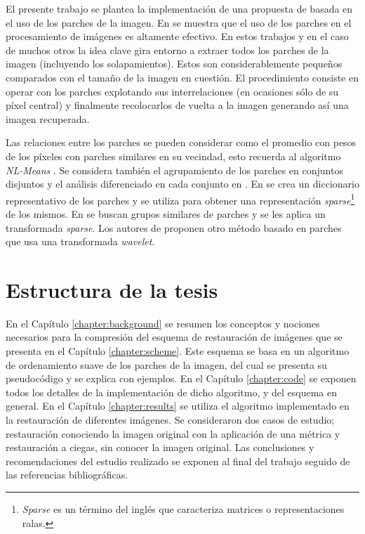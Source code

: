 El presente trabajo se plantea la implementaci\'on de una propuesta de \II basada en el uso de los parches de la imagen. En \cite{buades2005review,chatterjee2009clustering,yu2010image,yu2011solving,dong2011image,dong2011sparsity,zoran2011learning,elad2006image,mairal2007sparse,mairal2009non,zeyde2010single,dabov2007image,li2008patch} se muestra que el uso de los parches en el procesamiento de im\'agenes es altamente efectivo. En estos trabajos y en el caso de muchos otros la idea clave gira entorno a extraer todos los parches de la imagen (incluyendo los solapamientos). Estos son considerablemente pequeños comparados con el tamaño de la imagen en cuesti\'on. El procedimiento consiste en operar con los parches explotando sus interrelaciones (en ocasiones s\'olo de su p\'ixel central) y finalmente recolocarlos de vuelta a la imagen generando as\'i una imagen recuperada.

Las relaciones entre los parches se pueden considerar como el promedio con pesos de los p\'ixeles con parches similares en su vecindad, esto recuerda al algoritmo \textit{NL-Means} \cite{buades2005review}. Se considera tambi\'en el agrupamiento de los parches en conjuntos disjuntos y el análisis diferenciado en cada conjunto en \cite{chatterjee2009clustering,yu2010image,yu2011solving,dong2011image,dong2011sparsity,zoran2011learning}. En \cite{elad2006image,mairal2007sparse,mairal2009non,zeyde2010single} se crea un diccionario representativo de los parches y se utiliza para obtener una representaci\'on \textit{sparse}\footnote{\textit{Sparse} es un término del inglés que caracteriza matrices o representaciones ralas.} de los mismos. En \cite{mairal2009non,dabov2007image,li2008patch} se buscan grupos similares de parches y se les aplica un transformada \textit{sparse}. Los autores de \cite{ram2011generalized,ram2012redundant} proponen otro m\'etodo basado en parches que usa una transformada \textit{wavelet}.

\section*{Estructura de la tesis}

En el Cap\'itulo \ref{chapter:background} se resumen los conceptos y nociones necesarios para la compresi\'on del esquema de restauraci\'on de im\'agenes que se presenta en el Cap\'itulo \ref{chapter:scheme}. Este esquema se basa en un algoritmo de ordenamiento suave de los parches de la imagen, del cual se presenta su pseudoc\'odigo y se explica con ejemplos. En el Cap\'itulo \ref{chapter:code} se exponen todos los detalles de la implementaci\'on de dicho algoritmo, y del esquema en general. En el Cap\'itulo \ref{chapter:results} se utiliza el algoritmo implementado en la restauración de diferentes imágenes. Se consideraron dos casos de estudio; restauración conociendo la imagen original con la aplicación de una métrica y restauración a ciegas, sin conocer la imagen original. Las conclusiones y recomendaciones del estudio realizado se exponen al final del trabajo seguido de las referencias bibliográficas.
